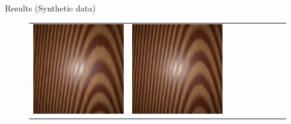 \documentclass[final]{beamer}
\newlength{\twocolwid}
\newlength{\resultwidth}
\begin{document}
\begin{frame}[t]
\begin{columns}[t]
\begin{column}{\twocolwid}
\begin{block}{Results (Synthetic data)}
\begin{figure}[t]
\begin{tabular}{ccrclcccc}
            		\includegraphics[width=\resultwidth]{synth/wood/good1.jpg} &
            		\includegraphics[width=\resultwidth]{synth/wood/good2.jpg} &

\end{tabular}
\end{figure}
\end{block}
\end{column}
\end{columns}
\end{frame}
\end{document}
